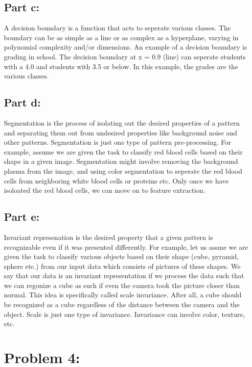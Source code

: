 \documentclass[a4paper,12pt]{article}
\begin{document}
\subsection*{Part c:}
A decision boundary is a function that acts to seperate various classes. The boundary can be as simple as a line or as complex as a hyperplane, varying in polynomial complexity and/or dimensions. An example of a decision boundary is grading in school. The decision boundary at x = 0.9 (line) can seperate students with a 4.0 and students with 3.5 or below. In this example, the grades are the various classes. 

\subsection*{Part d:}
Segmentation is the process of isolating out the desired properties of a pattern and separating them out from undesired properties like background noise and other patterns. Segmentation is just one type of pattern pre-processing. For example, assume we are given the task to classify red blood cells based on their shape in a given image.  Segmentation might involve removing the background plasma from the image, and using color segmentation to seperate the red blood cells from neighboring white blood cells or proteins etc. Only once we have isoloated the red blood cells, we can move on to feature extraction.

\subsection*{Part e:}
Invariant represenation is the desired property that a given pattern is recognizable even if it was presented differently. For example, let us assme we are given the task to classify various objects based on their shape (cube, pyramid, sphere etc.) from our input data which consists of pictures of these shapes. We say that our data is an invariant representation if we process the data such that we can regonize a cube as such if even the camera took the picture closer than normal. This idea is specifically called scale invariance. After all, a cube should be recognized as a cube regardless of the distance between the camera and the object. Scale is just one type of invariance. Invariance can involve color, texture, etc.

\section*{Problem 4:}
\end{document}
